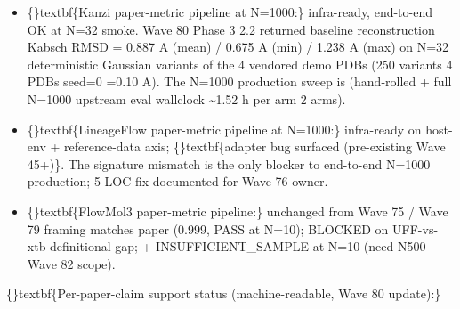 \documentclass{article}
\begin{document}
\begin{itemize}
\item \{\}textbf\{Kanzi paper-metric pipeline at N=1000:\} infra-ready, end-to-end OK at N=32 smoke. Wave 80 Phase 3 2.2 returned baseline reconstruction Kabsch RMSD = 0.887 A (mean) / 0.675 A (min) / 1.238 A (max) on N=32 deterministic Gaussian variants of the 4 vendored demo PDBs (250 variants  4 PDBs  seed=0 =0.10 A). The N=1000 production sweep is  (hand-rolled  + full N=1000 upstream eval wallclock \textasciitilde{}1.52 h per arm  2 arms).
\item \{\}textbf\{LineageFlow paper-metric pipeline at N=1000:\} infra-ready on host-env + reference-data axis; \{\}textbf\{adapter bug surfaced (pre-existing Wave 45+)\}. The  signature mismatch is the only blocker to end-to-end N=1000 production; 5-LOC fix documented for Wave 76 owner.
\item \{\}textbf\{FlowMol3 paper-metric pipeline:\} unchanged from Wave 75 / Wave 79 framing   matches paper (0.999, PASS at N=10);  BLOCKED on UFF-vs-xtb definitional gap;  +  INSUFFICIENT\_SAMPLE at N=10 (need N500  Wave 82 scope).
\end{itemize}
\{\}textbf\{Per-paper-claim support status (machine-readable, Wave 80 update):\}
\end{document}
